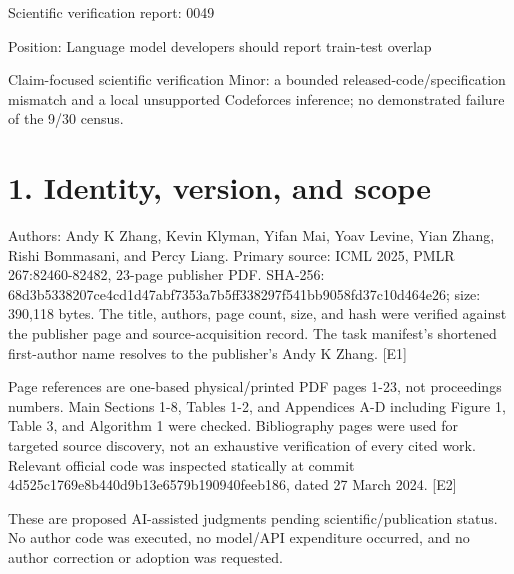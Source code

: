 \documentclass[10pt]{article}
\begin{document}
Scientific verification report: 0049\par
Position: Language model developers should report train-test overlap\par
Claim-focused scientific verification
Minor: a bounded released-code/specification mismatch and a local unsupported Codeforces inference; no demonstrated failure of the 9/30 census.\par
\section*{1. Identity, version, and scope}
Authors: Andy K Zhang, Kevin Klyman, Yifan Mai, Yoav Levine, Yian Zhang, Rishi Bommasani, and Percy Liang. Primary source: ICML 2025, PMLR 267:82460-82482, 23-page publisher PDF. SHA-256: 68d3b5338207ce4cd1d47abf7353a7b5ff338297f541bb9058fd37c10d464e26; size: 390,118 bytes. The title, authors, page count, size, and hash were verified against the publisher page and source-acquisition record. The task manifest’s shortened first-author name resolves to the publisher’s Andy K Zhang. [E1]\par
Page references are one-based physical/printed PDF pages 1-23, not proceedings numbers. Main Sections 1-8, Tables 1-2, and Appendices A-D including Figure 1, Table 3, and Algorithm 1 were checked. Bibliography pages were used for targeted source discovery, not an exhaustive verification of every cited work. Relevant official code was inspected statically at commit 4d525c1769e8b440d9b13e6579b190940feeb186, dated 27 March 2024. [E2]\par
These are proposed AI-assisted judgments pending scientific/publication status. No author code was executed, no model/API expenditure occurred, and no author correction or adoption was requested.\par
\end{document}
